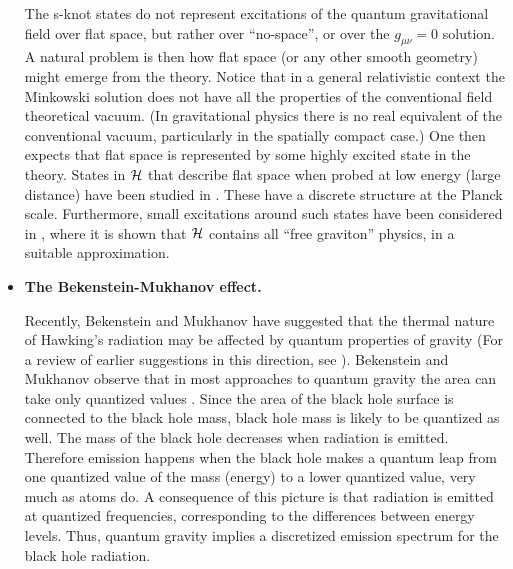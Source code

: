 \documentclass[12pt]{article}
\begin{document}
\begin{itemize}
The s-knot states do not represent excitations of the quantum 
gravitational field over flat space, but rather over 
``no-space'', or over the $g_{\mu\nu}=0$ solution.  A natural 
problem is then how flat space (or any other smooth geometry) 
might emerge from the theory.  Notice that in a general 
relativistic context the Minkowski solution does not have all the 
properties of the conventional field theoretical vacuum.  (In 
gravitational physics there is no real equivalent of the 
conventional vacuum, particularly in the spatially compact case.)  
One then expects that flat space is represented by some highly 
excited state in the theory.  States in $\cal H$ that describe 
flat space when probed at low energy (large distance) have been 
studied in \cite{weave,Zegwaard,Borissov,GrotRovelli}.  These 
have a discrete structure at the Planck scale.  Furthermore, 
small excitations around such states have been considered in 
\cite{IwasakiRovelli}, where it is shown that $\cal H$ contains 
all ``free graviton'' physics, in a suitable approximation.

\item {\bf The Bekenstein-Mukhanov effect.}

Recently, Bekenstein and Mukhanov \cite{BekensteinMukhanov} have 
suggested that the thermal nature of Hawking's radiation 
\cite{Hawking,Hawking2} may be affected by quantum properties of 
gravity (For a review of earlier suggestions in this direction, 
see \cite{SmolinMoG}).  Bekenstein and Mukhanov observe that in 
most approaches to quantum gravity the area can take only 
quantized values \cite{Garay}.  Since the area of the black hole 
surface is connected to the black hole mass, black hole mass is 
likely to be quantized as well.  The mass of the black hole 
decreases when radiation is emitted.  Therefore emission happens 
when the black hole makes a quantum leap from one quantized value 
of the mass (energy) to a lower quantized value, very much as 
atoms do.  A consequence of this picture is that radiation is 
emitted at quantized frequencies, corresponding to the 
differences between energy levels.  Thus, quantum gravity implies 
a discretized emission spectrum for the black hole radiation.


\end{itemize}
\end{document}
